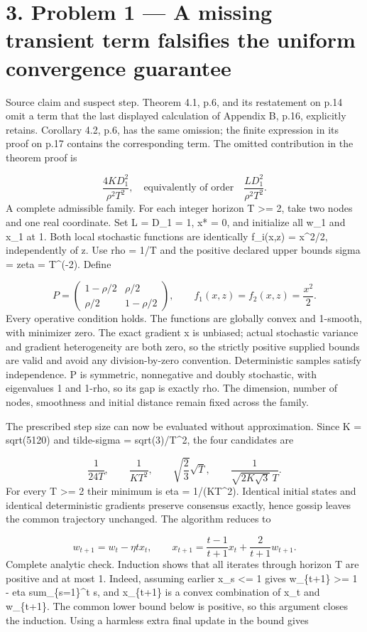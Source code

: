 \documentclass[10pt]{article}
\begin{document}
\section*{3. Problem 1 — A missing transient term falsifies the uniform convergence guarantee}
Source claim and suspect step. Theorem 4.1, p.6, and its restatement on p.14 omit a term that the last displayed calculation of Appendix B, p.16, explicitly retains. Corollary 4.2, p.6, has the same omission; the finite expression in its proof on p.17 contains the corresponding term. The omitted contribution in the theorem proof is\par
\[\frac{4KD_1^2}{\rho^2T^2},
\quad\text{equivalently of order}\quad
\frac{LD_1^2}{\rho^2T^2}.\] A complete admissible family. For each integer horizon T >= 2, take two nodes and one real coordinate. Set L = D\_1 = 1, x* = 0, and initialize all w\_1 and x\_1 at 1. Both local stochastic functions are identically f\_i(x,z) = x\textasciicircum{}2/2, independently of z. Use rho = 1/T and the positive declared upper bounds sigma = zeta = T\textasciicircum{}(-2). Define\par
\[P=\begin{pmatrix}1-\rho/2&\rho/2\\ \rho/2&1-\rho/2\end{pmatrix},
\qquad f_1(x,z)=f_2(x,z)=\frac{x^2}{2}.\] Every operative condition holds. The functions are globally convex and 1-smooth, with minimizer zero. The exact gradient x is unbiased; actual stochastic variance and gradient heterogeneity are both zero, so the strictly positive supplied bounds are valid and avoid any division-by-zero convention. Deterministic samples satisfy independence. P is symmetric, nonnegative and doubly stochastic, with eigenvalues 1 and 1-rho, so its gap is exactly rho. The dimension, number of nodes, smoothness and initial distance remain fixed across the family.\par
The prescribed step size can now be evaluated without approximation. Since K = sqrt(5120) and tilde-sigma = sqrt(3)/T\textasciicircum{}2, the four candidates are\par
\[\frac1{24T},\qquad \frac1{KT^2},\qquad
\sqrt{\frac23}\sqrt T,\qquad
\frac1{\sqrt{2K\sqrt3}\,T}.\] For every T >= 2 their minimum is eta = 1/(KT\textasciicircum{}2). Identical initial states and identical deterministic gradients preserve consensus exactly, hence gossip leaves the common trajectory unchanged. The algorithm reduces to\par
\[w_{t+1}=w_t-\eta t x_t,\qquad
x_{t+1}=\frac{t-1}{t+1}x_t+\frac{2}{t+1}w_{t+1}.\] Complete analytic check. Induction shows that all iterates through horizon T are positive and at most 1. Indeed, assuming earlier x\_s <= 1 gives w\_\{t+1\} >= 1 - eta sum\_\{s=1\}\textasciicircum{}t s, and x\_\{t+1\} is a convex combination of x\_t and w\_\{t+1\}. The common lower bound below is positive, so this argument closes the induction. Using a harmless extra final update in the bound gives\par
\end{document}
